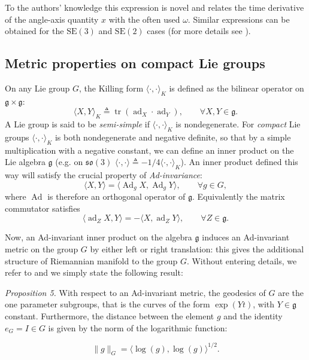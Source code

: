 \documentclass[10pt,twocolumn]{article}
\newcommand{\SE}{\mathrm{SE}}
\newcommand{\so}{\mathfrak{so}}
\newcommand{\gfrak}{\mathfrak g}
\newcommand{\Ad}{\operatorname{Ad}}
\newcommand{\ad}{\operatorname{ad}}
\newcommand{\tr}{\operatorname{tr}}
\newcounter{paperitem}
\newcommand{\paperhead}[3]{\refstepcounter{paperitem}\par\medskip\noindent\textit{#1}\label{#3} #2\par}
\begin{document}
To the authors' knowledge this expression is novel and relates the time derivative of the angle-axis quantity $x$ with the often used $\omega$. Similar expressions can be obtained for the $\SE(3)$ and $\SE(2)$ cases (for more details see \cite{8}).

\subsection{Metric properties on compact Lie groups}\label{subsec:metric-compact}
On any Lie group $G$, the Killing form $\langle\cdot,\cdot\rangle_K$ is defined as the bilinear operator on $\gfrak\times\gfrak$:
\begin{equation*}
\langle X,Y\rangle_K\triangleq\tr(\ad_X\cdot\ad_Y),\qquad \forall X,Y\in\gfrak.
\end{equation*}
A Lie group is said to be \emph{semi-simple} if $\langle\cdot,\cdot\rangle_K$ is nondegenerate. For \emph{compact} Lie groups $\langle\cdot,\cdot\rangle_K$ is both nondegenerate and negative definite, so that by a simple multiplication with a negative constant, we can define an inner product on the Lie algebra $\gfrak$ (e.g. on $\so(3)$ $\langle\cdot,\cdot\rangle\triangleq-1/4\langle\cdot,\cdot\rangle_K$). An inner product defined this way will satisfy the crucial property of \emph{Ad-invariance}:
\begin{equation*}
\langle X,Y\rangle=\langle\Ad_gX,\Ad_gY\rangle,\qquad \forall g\in G,
\end{equation*}
where $\Ad$ is therefore an orthogonal operator of $\gfrak$. Equivalently the matrix commutator satisfies
\begin{equation*}
\langle\ad_ZX,Y\rangle=-\langle X,\ad_ZY\rangle,
\qquad \forall Z\in\gfrak.\tag{2}\label{eq:2}
\end{equation*}

Now, an Ad-invariant inner product on the algebra $\gfrak$ induces an Ad-invariant metric on the group $G$ by either left or right translation: this gives the additional structure of Riemannian manifold to the group $G$. Without entering details, we refer to \cite{9} and we simply state the following result:



\paperhead{Proposition 5.}{With respect to an Ad-invariant metric, the geodesics of $G$ are the one parameter subgroups, that is the curves of the form $\exp(Yt)$, with $Y\in\gfrak$ constant. Furthermore, the distance between the element $g$ and the identity $e_G=I\in G$ is given by the norm of the logarithmic function:}{prop:geodesics}
\begin{equation*}
\|g\|_G=\langle\log(g),\log(g)\rangle^{1/2}.\tag{3}\label{eq:3}
\end{equation*}
\end{document}

